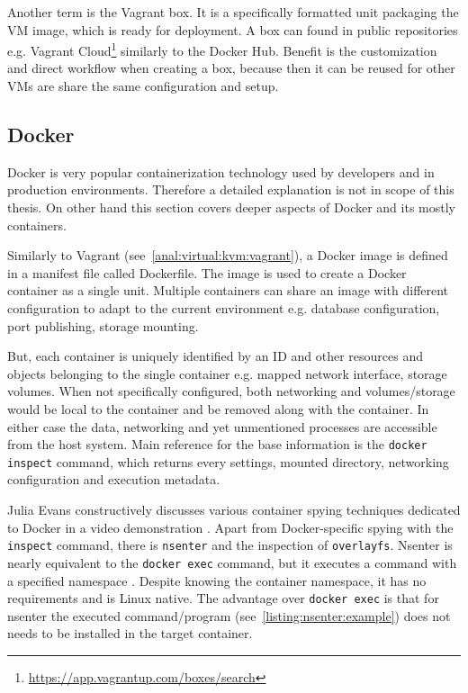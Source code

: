 Another term is the Vagrant box. It is a specifically formatted unit packaging the VM image, which is ready for deployment. A box can found in public repositories e.g. Vagrant Cloud\footnote{\url{https://app.vagrantup.com/boxes/search}} similarly to the Docker Hub. Benefit is the customization and direct workflow when creating a box, because then it can be reused for other VMs are share the same configuration and setup.

\subsection{Docker \label{anal:virtual:docker}}
Docker is very popular containerization technology used by developers and in production environments. Therefore a detailed explanation is not in scope of this thesis. On other hand this section covers deeper aspects of Docker and its mostly containers.

Similarly to Vagrant (see~\autoref{anal:virtual:kvm:vagrant}), a Docker image is defined in a manifest file called Dockerfile. The image is used to create a Docker container as a single unit. Multiple containers can share an image with different configuration to adapt to the current environment e.g. database configuration, port publishing, storage mounting. 

But, each container is uniquely identified by an ID and other resources and objects belonging to the single container e.g. mapped network interface, storage volumes. When not specifically configured, both networking and volumes/storage would be local to the container and be removed along with the container. In either case the data, networking and yet unmentioned processes are accessible from the host system. Main reference for the base information is the \texttt{docker inspect} command, which returns every settings, mounted directory, networking configuration and execution metadata.

Julia Evans constructively discusses various container spying techniques dedicated to Docker in a video demonstration \cite{video:docker:spying}. Apart from Docker-specific spying with the \texttt{inspect} command, there is \texttt{nsenter} and the inspection of \texttt{overlayfs}. Nsenter is nearly equivalent to the \texttt{docker exec} command, but it executes a command with a specified namespace \cite{man:nsenter}. Despite knowing the container namespace, it has no requirements and is Linux native. The advantage over \texttt{docker exec} is that for nsenter the executed command/program (see~\autoref{listing:nsenter:example}) does not needs to be installed in the target container.

